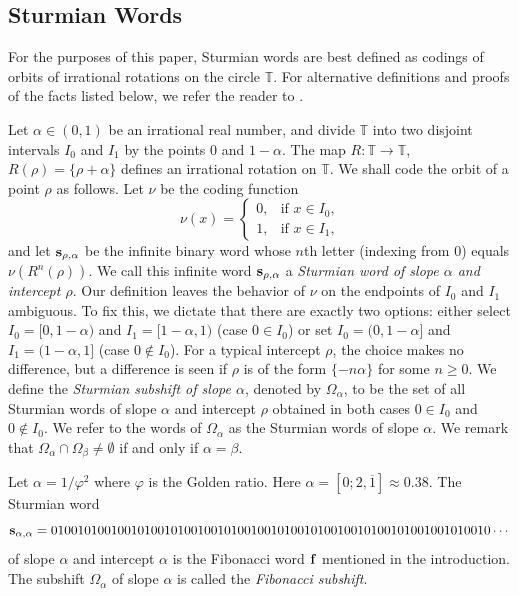\documentclass[a4paper,fleqn]{article}
\newcommand{\infw}[1]{%
  \ifcat\noexpand#1\relax\bm{#1}%
  \else\mathbf{#1}\fi}          %
\newcommand{\T}{\mathbb{T}}
\begin{document}
  \subsection{Sturmian Words}
  For the purposes of this paper, Sturmian words are best defined as codings of orbits of irrational rotations on the
  circle $\T$. For alternative definitions and proofs of the facts listed below, we refer the reader to
  \cite{2002:algebraic_combinatorics_on_words,2002:substitutions_in_dynamics_arithmetics_and_combinatorics}.

  Let $\alpha \in (0, 1)$ be an irrational real number, and divide $\T$ into two disjoint intervals $I_0$ and $I_1$ by
  the points $0$ and $1 - \alpha$. The map $R\colon \T \to \T$, $R(\rho) = \{\rho + \alpha\}$ defines an irrational
  rotation on $\T$. We shall code the orbit of a point $\rho$ as follows. Let $\nu$ be the coding function
  \begin{equation*}
    \nu(x) = \begin{cases}
               0, &\text{if $x \in I_0$,} \\
               1, &\text{if $x \in I_1$,}
             \end{cases}
  \end{equation*}
  and let $\infw{s}_{\rho,\alpha}$ be the infinite binary word whose $n$th letter (indexing from $0$) equals
  $\nu(R^n(\rho))$. We call this infinite word $\infw{s}_{\rho,\alpha}$ a \emph{Sturmian word of slope $\alpha$ and
  intercept $\rho$}. Our definition leaves the behavior of $\nu$ on the endpoints of $I_0$ and $I_1$ ambiguous. To fix
  this, we dictate that there are exactly two options: either select $I_0 = [0, 1-\alpha)$ and $I_1 = [1-\alpha, 1)$
  (case $0 \in I_0$) or set $I_0 = (0, 1-\alpha]$ and $I_1 = (1-\alpha, 1]$ (case $0 \notin I_0$). For a typical
  intercept $\rho$, the choice makes no difference, but a difference is seen if $\rho$ is of the form $\{-n\alpha\}$
  for some $n \geq 0$. We define the \emph{Sturmian subshift of slope $\alpha$}, denoted by $\Omega_\alpha$, to be the
  set of all Sturmian words of slope $\alpha$ and intercept $\rho$ obtained in both cases $0 \in I_0$ and $0 \notin I_0$.
  We refer to the words of $\Omega_\alpha$ as the Sturmian words of slope $\alpha$. We remark that
  $\Omega_\alpha \cap \Omega_\beta \neq \emptyset$ if and only if $\alpha = \beta$.

  \begin{example}
    Let $\alpha = 1/\varphi^2$ where $\varphi$ is the Golden ratio. Here $\alpha = [0; 2, \overline{1}] \approx 0.38$.
    The Sturmian word
    \begin{equation*}
      \infw{s}_{\alpha,\alpha} = 010010100100101001010010010100100101001010010010100101001001010010 \dotsm
    \end{equation*}
    of slope $\alpha$ and intercept $\alpha$ is the Fibonacci word $\infw{f}$ mentioned in the introduction. The
    subshift $\Omega_\alpha$ of slope $\alpha$ is called the \emph{Fibonacci subshift}.
  \end{example}
\end{document}
